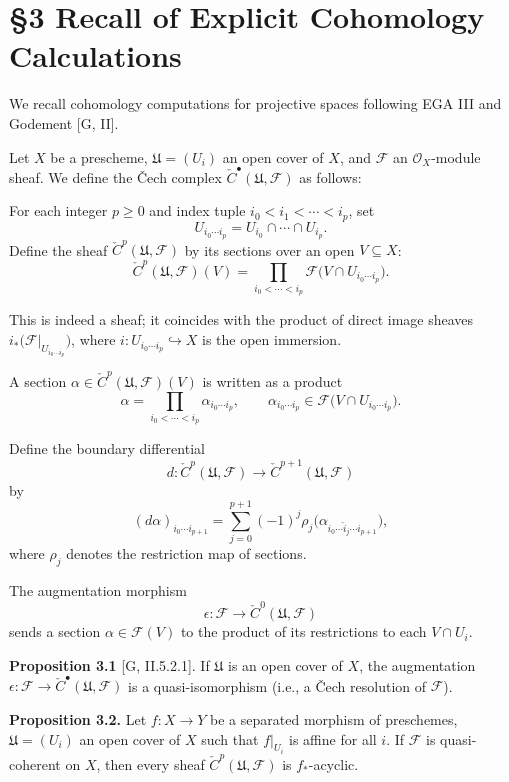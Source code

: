 \setcounter{page}{148}
\section{\S3 Recall of Explicit Cohomology Calculations}

We recall cohomology computations for projective spaces following EGA III and Godement [G, II].

Let $X$ be a prescheme, $\mathfrak{U}=(U_i)$ an open cover of $X$, and $\mathcal{F}$ an $\mathcal{O}_X$-module sheaf.
We define the \v{C}ech complex $\check{C}^\bullet(\mathfrak{U},\mathcal{F})$ as follows:

For each integer $p\ge 0$ and index tuple $i_0<i_1<\cdots<i_p$, set
\[
U_{i_0\cdots i_p} = U_{i_0}\cap\cdots\cap U_{i_p}.
\]
Define the sheaf $\check{C}^p(\mathfrak{U},\mathcal{F})$ by its sections over an open $V\subseteq X$:
\[
\check{C}^p(\mathfrak{U},\mathcal{F})(V)
= \prod_{i_0<\cdots<i_p} \mathcal{F}\big(V\cap U_{i_0\cdots i_p}\big).
\]

This is indeed a sheaf; it coincides with the product of direct image sheaves
$i_*\big(\mathcal{F}|_{U_{i_0\cdots i_p}}\big)$, where $i:U_{i_0\cdots i_p}\hookrightarrow X$ is the open immersion.

A section $\alpha\in\check{C}^p(\mathfrak{U},\mathcal{F})(V)$ is written as a product
\[
\alpha = \prod_{i_0<\cdots<i_p} \alpha_{i_0\cdots i_p},\qquad
\alpha_{i_0\cdots i_p}\in\mathcal{F}\big(V\cap U_{i_0\cdots i_p}\big).
\]

\setcounter{page}{149}
Define the boundary differential
\[
d\colon \check{C}^p(\mathfrak{U},\mathcal{F})
\to \check{C}^{p+1}(\mathfrak{U},\mathcal{F})
\]
by
\[
(d\alpha)_{i_0\cdots i_{p+1}}
= \sum_{j=0}^{p+1} (-1)^j \rho_j\big(\alpha_{i_0\cdots\hat{i}_j\cdots i_{p+1}}\big),
\]
where $\rho_j$ denotes the restriction map of sections.

The augmentation morphism
\[
\epsilon\colon \mathcal{F} \to \check{C}^0(\mathfrak{U},\mathcal{F})
\]
sends a section $\alpha\in\mathcal{F}(V)$ to the product of its restrictions to each $V\cap U_i$.

\textbf{Proposition 3.1} [G, II.5.2.1].
If $\mathfrak{U}$ is an open cover of $X$, the augmentation $\epsilon\colon\mathcal{F}\to\check{C}^\bullet(\mathfrak{U},\mathcal{F})$
is a quasi-isomorphism (i.e., a \v{C}ech resolution of $\mathcal{F}$).

\textbf{Proposition 3.2.}
Let $f\colon X\to Y$ be a separated morphism of preschemes, $\mathfrak{U}=(U_i)$ an open cover of $X$ such that $f|_{U_i}$ is affine for all $i$.
If $\mathcal{F}$ is quasi-coherent on $X$, then every sheaf $\check{C}^p(\mathfrak{U},\mathcal{F})$ is $f_*$-acyclic.

